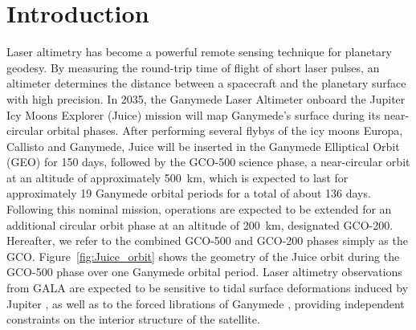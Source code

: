 \documentclass[lineno, pdflatex,sn-mathphys-ay]{sn-jnl}
\theoremstyle{thmstyleone}%
\theoremstyle{thmstyletwo}%
\theoremstyle{thmstylethree}%
\begin{document}
\section{Introduction}

Laser altimetry has become a powerful remote sensing technique for planetary geodesy. By measuring the round-trip time of flight of short laser pulses, an altimeter determines the distance between a spacecraft and the planetary surface with high precision.
%
In 2035, the Ganymede Laser Altimeter \citep[GALA;][]{2025SSRv..221...33H, 2022AdSpR..69.2283E,2019JSAST..17..234K} onboard the Jupiter Icy Moons Explorer (Juice) mission will map Ganymede's surface during its near-circular orbital phases. 
%
After performing several flybys of the icy moons Europa, Callisto and Ganymede, Juice will be inserted in the Ganymede Elliptical Orbit (GEO) for 150 days, followed by the GCO-500 science phase, a near-circular orbit at an altitude of approximately \SI{500}{km}, which is expected to last for approximately 19 Ganymede orbital periods for a total of about 136 days.
%
Following this nominal mission, operations are expected to be extended for an additional circular orbit phase at an altitude of \SI{200}{km}, designated GCO-200. Hereafter, we refer to the combined GCO-500 and GCO-200 phases simply as the GCO. Figure~\ref{fig:Juice_orbit} shows the geometry of the Juice orbit during the GCO-500 phase over one Ganymede orbital period.
%
Laser altimetry observations from GALA are expected to be sensitive to tidal surface deformations induced by Jupiter \citep{2015P&SS..117..184S}, as well as to the forced librations of Ganymede \citep{2019Geosc...9..320S}, providing independent constraints on the interior structure of the satellite.


\end{document}
